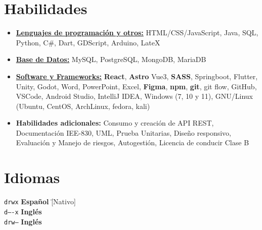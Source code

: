 \documentclass[11pt,a4paper,sans]{moderncv}
\newcommand{\sectionMargin}{-3mm}
\begin{document}
\vspace*{\sectionMargin}
\section{Habilidades}{
    \begin{itemize}[label=\textbullet, noitemsep]
        \item {\underline{\textbf{Lenguajes de programación y otros:}}
            {HTML/CSS/JavaScript},
            {Java},
            {SQL},
            {Python},
            {C\#},
            {Dart},
            {GDScript},
            {Arduino},
            {LateX}
        }
        \item {\underline{\textbf{Base de Datos:}}
            {MySQL},
            {PostgreSQL},
            {MongoDB},
            {MariaDB}
        }
        \item {\underline{\textbf{Software y Frameworks:}}
            \textbf{React},
            \textbf{Astro}
            {Vue3},
            \textbf{SASS},
            {Springboot},
            {Flutter},
            {Unity},
            {Godot},
            {Word},
            {PowerPoint},
            {Excel}, 
            \textbf{Figma},
            \textbf{npm},
            \textbf{git},
            {git flow},
            {GitHub},
            {VSCode},
            {Android Studio},
            {IntelliJ IDEA},
            {Windows} (7, 10 y 11),
            {GNU/Linux} (Ubuntu, CentOS, ArchLinux, fedora, kali)
        }
        \item {\textbf{Habilidades adicionales:} 
            Consumo y creación de {API REST},
            {Documentación IEE-830},
            {UML},
            {Prueba Unitarias},
            {Diseño responsivo},
            Evaluación y {Manejo de riesgos},  
            {Autogestión}, 
            Licencia de conducir {Clase B}
        }
    \end{itemize}
}

\vspace*{\sectionMargin}

\section{Idiomas}{
\begin{tabbing}
    \texttt{drwx} \hspace{1mm}\= \textbf{Español} \hspace{1mm}\= [Nativo] \\
    \texttt{d----x} \> \textbf{Inglés} \> [B1] \\
    \texttt{drw--} \> \textbf{Inglés} \> [Técnico]
\end{tabbing}

}
\end{document}
